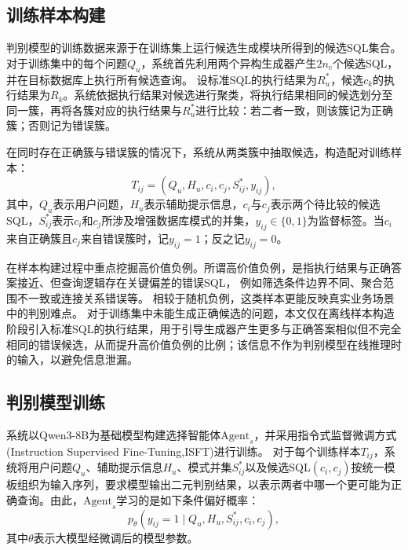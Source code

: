 \subsection{训练样本构建}

判别模型的训练数据来源于在训练集上运行候选生成模块所得到的候选SQL集合。
对于训练集中的每个问题$Q_u$，系统首先利用两个异构生成器产生$2n_c$个候选SQL，并在目标数据库上执行所有候选查询。
设标准SQL的执行结果为$R_u^{*}$，候选$c_k$的执行结果为$R_k$。系统依据执行结果对候选进行聚类，将执行结果相同的候选划分至同一簇，再将各簇对应的执行结果与$R_u^{*}$进行比较：若二者一致，则该簇记为正确簇；否则记为错误簇。

在同时存在正确簇与错误簇的情况下，系统从两类簇中抽取候选，构造配对训练样本：
\begin{equation}
T_{ij}=(Q_u,H_u,c_i,c_j,S^{*}_{ij},y_{ij}),
\end{equation}
其中，$Q_u$表示用户问题，$H_u$表示辅助提示信息，$c_i$与$c_j$表示两个待比较的候选SQL，$S^{*}_{ij}$表示$c_i$和$c_j$所涉及增强数据库模式的并集，$y_{ij}\in\{0,1\}$为监督标签。当$c_i$来自正确簇且$c_j$来自错误簇时，记$y_{ij}=1$；反之记$y_{ij}=0$。

在样本构建过程中重点挖掘高价值负例。所谓高价值负例，是指执行结果与正确答案接近、但查询逻辑存在关键偏差的错误SQL，
例如筛选条件边界不同、聚合范围不一致或连接关系错误等。
相较于随机负例，这类样本更能反映真实业务场景中的判别难点。
对于训练集中未能生成正确候选的问题，本文仅在离线样本构造阶段引入标准SQL的执行结果，用于引导生成器产生更多与正确答案相似但不完全相同的错误候选，从而提升高价值负例的比例；该信息不作为判别模型在线推理时的输入，以避免信息泄漏。

\subsection{判别模型训练}

系统以Qwen3-8B\cite{qwen32024}为基础模型构建选择智能体$\text{Agent}_s$，并采用指令式监督微调方式\cite{ouyang2022instructgpt}(Instruction Supervised Fine-Tuning,ISFT)进行训练。
对于每个训练样本$T_{ij}$，系统将用户问题$Q_u$、辅助提示信息$H_u$、模式并集$S^{*}_{ij}$以及候选SQL$(c_i,c_j)$按统一模板组织为输入序列，要求模型输出二元判别结果，以表示两者中哪一个更可能为正确查询。由此，$\text{Agent}_s$学习的是如下条件偏好概率：
\begin{equation}
p_{\theta}(y_{ij}=1 \mid Q_u,H_u,S^{*}_{ij},c_i,c_j),
\end{equation}
其中$\theta$表示大模型经微调后的模型参数。

